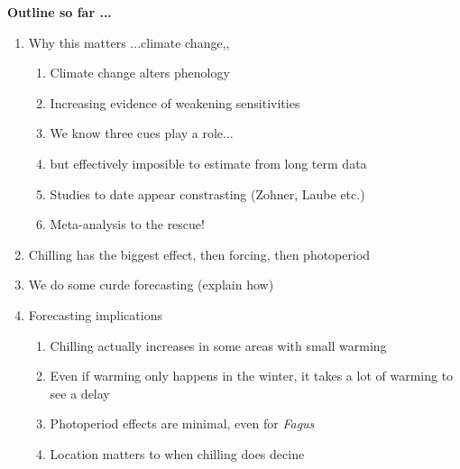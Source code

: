 \documentclass[11pt,letter]{article}
\begin{document}
{\bf Outline so far ...}

\begin{enumerate}
\item Why this matters ...climate change,, 
\begin{enumerate}
\item Climate change alters phenology
\item Increasing evidence of weakening sensitivities
\item We know three cues play a role...
\item but effectively imposible to estimate from long term data
\item Studies to date appear constrasting (Zohner, Laube etc.)
\item Meta-analysis to the rescue!
\end{enumerate}
\item Chilling has the biggest effect, then forcing, then photoperiod
\item We do some curde forecasting (explain how)
\item Forecasting implications
\begin{enumerate}
\item Chilling actually increases in some areas with small warming
\item Even if warming only happens in the winter, it takes a lot of warming to see a delay 
\item Photoperiod effects are minimal, even for \emph{Fagus}
\item Location matters to when chilling does decine
\end{enumerate}
\end{enumerate}
\end{document}
